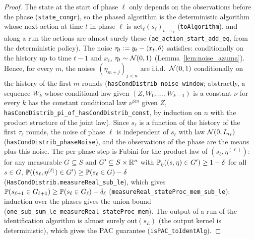 \begin{proof}
\leanok
{}
The state at the start of phase $\ell$ only depends on the observations before the phase
(\texttt{state\_congr}), so the phased algorithm is the deterministic algorithm whose next
action at time $t$ in phase $\ell$ is $\mathrm{act}_\ell(s_\ell)_{t - \tau_\ell}$
(\texttt{toAlgorithm}), and along a run the actions are almost surely these
(\texttt{ae\_action\_start\_add\_eq}, from the deterministic policy).
The noise $\eta_t := y_t - \langle x_t, \theta \rangle$ satisfies: conditionally on the history up to
time $t - 1$ and $x_t$, $\eta_t \sim \mathcal{N}(0,1)$ (Lemma~\ref{lem:noise_azuma}). Hence, for
every $m$, the noises $(\eta_{m+j})_{j < n}$ are i.i.d.\ $\mathcal{N}(0,1)$ conditionally on the
history of the first $m$ rounds (\texttt{hasCondDistrib\_noise\_window}; abstractly, a
sequence $W_k$ whose conditional law given $(Z, W_0, \dots, W_{k-1})$ is a constant $\nu$ for
every $k$ has the constant conditional law $\nu^{\otimes n}$ given $Z$,
\texttt{hasCondDistrib\_pi\_of\_hasCondDistrib\_const}, by induction on $n$ with the product
structure of the joint law). Since $s_\ell$ is a function of the history of the first
$\tau_\ell$ rounds, the noise of phase $\ell$ is independent of $s_\ell$ with law
$\mathcal{N}(0, I_{n_\ell})$ (\texttt{hasCondDistrib\_phaseNoise}), and the observations of the
phase are the means plus this noise. The per-phase step is Fubini for the product law of
$(s_\ell, \eta^{(\ell)})$: for any measurable $G \subseteq S$ and $G' \subseteq S \times \mathbb{R}^n$
with $\mathbb{P}_\eta((s, \eta) \in G') \ge 1 - \delta$ for all $s \in G$,
$\mathbb{P}((s_\ell, \eta^{(\ell)}) \in G') \ge \mathbb{P}(s_\ell \in G) - \delta$
(\texttt{HasCondDistrib.measureReal\_sub\_le}), which gives
$\mathbb{P}(s_{\ell+1} \in G_{\ell+1}) \ge \mathbb{P}(s_\ell \in G_\ell) - \delta_\ell$
(\texttt{measureReal\_stateProc\_mem\_sub\_le}); induction over the phases gives the union
bound (\texttt{one\_sub\_sum\_le\_measureReal\_stateProc\_mem}). The output of a run of the
identification algorithm is almost surely $\mathrm{out}(s_L)$ (the output kernel is
deterministic), which gives the PAC guarantee (\texttt{isPAC\_toIdentAlg}).
\end{proof}
